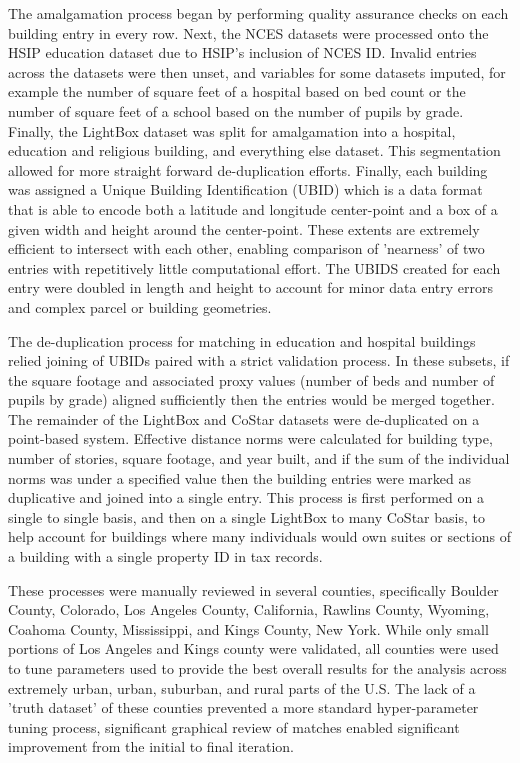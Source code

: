 The amalgamation process began by performing quality assurance checks on each building entry in every row. Next, the NCES datasets were processed onto the HSIP education dataset due to HSIP's inclusion of NCES ID. Invalid entries across the datasets were then unset, and variables for some datasets imputed, for example the number of square feet of a hospital based on bed count or the number of square feet of a school based on the number of pupils by grade. Finally, the LightBox dataset was split for amalgamation into a hospital, education and religious building, and everything else dataset. This segmentation allowed for more straight forward de-duplication efforts. Finally, each building was assigned a Unique Building Identification (UBID) which is a data format that is able to encode both a latitude and longitude center-point and a box of a given width and height around the center-point. These extents are extremely efficient to intersect with each other, enabling comparison of 'nearness' of two entries with repetitively little computational effort. The UBIDS created for each entry were doubled in length and height to account for minor data entry errors and complex parcel or building geometries.

The de-duplication process for matching in education and hospital buildings relied joining of UBIDs paired with a strict validation process. In these subsets, if the square footage and associated proxy values (number of beds and number of pupils by grade) aligned sufficiently then the entries would be merged together. The remainder of the LightBox and CoStar datasets were de-duplicated on a point-based system. Effective distance norms were calculated for building type, number of stories, square footage, and year built, and if the sum of the individual norms was under a specified value then the building entries were marked as duplicative and joined into a single entry. This process is first performed on a single to single basis, and then on a single LightBox to many CoStar basis, to help account for buildings where many individuals would own suites or sections of a building with a single property ID in tax records.

These processes were manually reviewed in several counties, specifically Boulder County, Colorado, Los Angeles County, California, Rawlins County, Wyoming, Coahoma County, Mississippi, and Kings County, New York. While only small portions of Los Angeles and Kings county were validated, all counties were used to tune parameters used to provide the best overall results for the analysis across extremely urban, urban, suburban, and rural parts of the U.S. The lack of a 'truth dataset' of these counties prevented a more standard hyper-parameter tuning process, significant graphical review of matches enabled significant improvement from the initial to final iteration.

